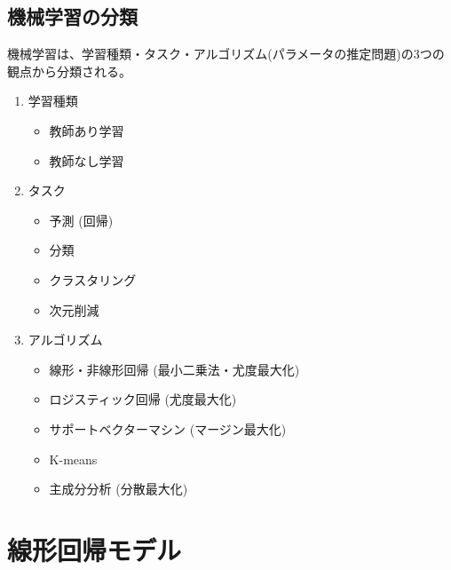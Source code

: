 \documentclass{ltjsarticle}
\begin{document}
\subsection{機械学習の分類}
機械学習は、学習種類・タスク・アルゴリズム(パラメータの推定問題)の3つの観点から分類される。
\begin{enumerate}
  \item 学習種類
  \begin{itemize}
    \item 教師あり学習
    \item 教師なし学習
  \end{itemize}
  \item タスク
  \begin{itemize}
    \item 予測 (回帰)
    \item 分類
    \item クラスタリング
    \item 次元削減
  \end{itemize}
  \item アルゴリズム
  \begin{itemize}
    \item 線形・非線形回帰 (最小二乗法・尤度最大化)
    \item ロジスティック回帰 (尤度最大化)
    \item サポートベクターマシン (マージン最大化)
    \item K-means
    \item 主成分分析 (分散最大化)
  \end{itemize}
\end{enumerate}

\newpage

\section{線形回帰モデル}
\end{document}
